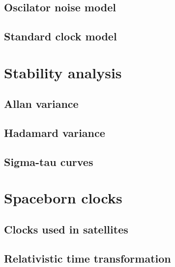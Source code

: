\subsection{Oscilator noise model}

\subsection{Standard clock model}


\section{Stability analysis}

\subsection{Allan variance}

\subsection{Hadamard variance}

\subsection{Sigma-tau curves}



\section{Spaceborn clocks}

\subsection{Clocks used in satellites}

\subsection{Relativistic time transformation}

